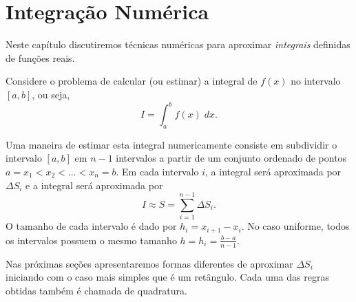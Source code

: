 
%

\chapter{Integração Numérica}

Neste capítulo discutiremos técnicas numéricas para aproximar \emph{integrais} definidas de funções reais.

Considere o problema de calcular (ou estimar) a integral de $f(x)$ no intervalo $[a,b]$, ou seja,
$$
 I = \int_a^b f(x) \;dx.
$$

Uma maneira de estimar esta integral numericamente consiste em subdividir o intervalo $[a,b]$ em $n-1$ intervalos a partir de um conjunto ordenado de pontos $a=x_1<x_2<...<x_n=b$.
Em cada intervalo $i$, a integral será aproximada por $\Delta S_i$ e a integral será aproximada por
$$
 I \approx S = \sum_{i=1}^{n-1} \Delta S_i.
$$
O tamanho de cada intervalo é dado por $h_i=x_{i+1}-x_i$. No caso uniforme, todos os intervalos possuem o mesmo tamanho $h=h_i=\frac{b-a}{n-1}$.

Nas próximas seções apresentaremos formas diferentes de aproximar $\Delta S_i$ iniciando com o caso mais simples que é um retângulo. Cada uma das regras obtidas também é chamada de quadratura.

